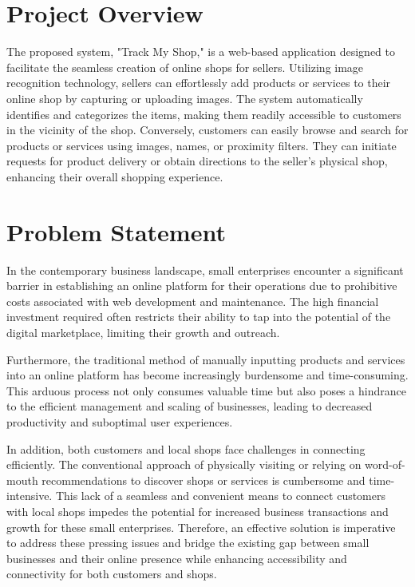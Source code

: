 \section{Project Overview}
The proposed system, "Track My Shop," is a web-based application designed to facilitate the seamless creation of online shops for sellers. Utilizing image recognition technology, sellers can effortlessly add products or services to their online shop by capturing or uploading images. The system automatically identifies and categorizes the items, making them readily accessible to customers in the vicinity of the shop. Conversely, customers can easily browse and search for products or services using images, names, or proximity filters. They can initiate requests for product delivery or obtain directions to the seller's physical shop, enhancing their overall shopping experience.

\section{Problem Statement}
In the contemporary business landscape, small enterprises encounter a significant barrier in establishing an online platform for their operations due to prohibitive costs associated with web development and maintenance. The high financial investment required often restricts their ability to tap into the potential of the digital marketplace, limiting their growth and outreach.

Furthermore, the traditional method of manually inputting products and services into an online platform has become increasingly burdensome and time-consuming. This arduous process not only consumes valuable time but also poses a hindrance to the efficient management and scaling of businesses, leading to decreased productivity and suboptimal user experiences.

In addition, both customers and local shops face challenges in connecting efficiently. The conventional approach of physically visiting or relying on word-of-mouth recommendations to discover shops or services is cumbersome and time-intensive. This lack of a seamless and convenient means to connect customers with local shops impedes the potential for increased business transactions and growth for these small enterprises. Therefore, an effective solution is imperative to address these pressing issues and bridge the existing gap between small businesses and their online presence while enhancing accessibility and connectivity for both customers and shops.

